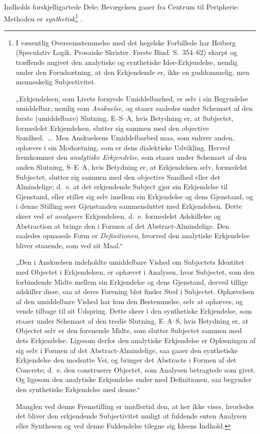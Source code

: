 \documentclass[12pt]{book}
\newcommand{\opage}[1]{\marginnote{\footnotesize\textit{[#1]}}}
\begin{document}
\opage{371}Indholds forskjelligartede Dele; Bevægelsen gaaer fra Centrum til Peripherie: Methoden er \emph{synthetisk}\footnote{I væsentlig Overeensstemmelse med det hegelske Forbillede har Heiberg (Speculativ Logik. Prosaiske Skrister. %
Første Bind. S.~354--62) skarpt og træffende angivet den analytiske og synthetiske Idee-Erkjendelse, nemlig under den Forudsætning, at den Erkjendende er, ikke en guddommelig, men menneskelig Subjectivitet.\par
„Erkjendelsen, som Livets fornyede Umiddelbarhed, er selv i sin Begyndelse umiddelbar, nemlig som \emph{Anskuelse}, og staaer saaledes under Schemaet af den første (umiddelbare) Slutning, E--S--A, hvis Betydning er, at Subjectet, formedelst Erkjendelsen, slutter sig sammen med den objective Sandhed.~\dots\ Men Anskuelsens Umiddelbarbed %
maa, som enhver anden, ophæves i sin Modsætning, som er dens dialektiske Udvikling. Herved fremkommer den \emph{analytiske Erkjendelse}, som staaer under Schemaet af den anden Slutning, S--E--A, hvis Betydning er, at Erkjendelsen selv, formedelst Subjectet, slutter sig sammen med den objective Sandhed eller det Almindelige; d.~e. at det erkjendende Subject gjør sin Erkjendelse til Gjenstand, eller stiller sig selv imellem sin Erkjendelse og dens Gjenstand, og i denne Stilling seer Gjenstanden sammensluttet med Erkjendelsen. Dette skeer ved \emph{at analysere} Erkjendelsen, d.~e. formedelst Adskillelse og Abstraction at bringe den i Formen af det Abstract-Almindelige. Den saaledes opnaaede Form er \emph{Definitionen}, hvorved den analytiske Erkjendelse bliver staaende, som ved sit Maal.“\par
„Den i Anskuelsen indeholdte umiddelbare Vished om Subjectets Identitet med Objectet i Erkjendelsen, er ophævet i Analysen, hvor Subjectet, som den forbindende Midte mellem sin Erkjendelse og dens Gjenstand, derved tillige adskiller disse, saa at deres Forening blot finder Sted i Subjectet. Ophævelsen af den umiddelbare Vished har kun den Bestemmelse, selv at ophæves, og vende tilbage til sit Udspring. Dette skeer i den synthetiske Erkjendelse, som staaer under Schemaet af den tredie Slutning, E--A--S, hvis Betydning er, at Objectet selv er den forenende Midte, som slutter Subjectet sammen med dets Erkjendelse. Ligesom derfor den analytiske Erkjendelse er Opløsningen af sig selv i Formen af det Abstract-Almindelige, saa gaaer den synthetiske
Erkjendelse den modsatte Vei, og bringer det Abstracte i Formen af det Concrete; d.~e. den construerer Objectet, som Analysen betragtede som givet. Og ligesom den analytiske Erkjendelse ender med Definitionen, saa begynder den synthetiske Erkjendelse med denne.“\par
Manglen ved denne Fremstilling er imidlertid den, at her ikke vises, hvorledes det bliver den erkjendende Subjectivitet muligt at fuldende enten Analysen eller Synthesen og ved denne Fuldendelse tilegne sig Ideens Indhold.}%
.
\end{document}
